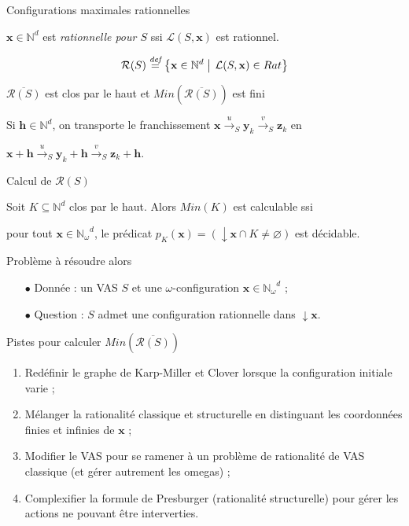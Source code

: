 \documentclass[french]{beamer}
\newcommand{\set}[2]{\left\{#1\mathrel{\left|\vphantom{#1}\vphantom{#2}\right.}#2\right\}}
\newcommand{\defeq}{\ensuremath{\stackrel{\textit{def}}{=}}}
\let\vide\varnothing
\newcommand{\Min}{\textit{Min}}
\newcommand{\N}{\ensuremath{\mathbb{N}}}
\newcommand{\Nomega}{\ensuremath{\mathbb{N}_\omega}}
\newcommand{\lang}{\ensuremath{\mathcal{L}}}
\newcommand{\trans}[2]{\ensuremath{\stackrel{#1}{\longrightarrow}_{#2}}}
\newcommand{\vect}[1]{\ensuremath{\mathbf{#1}}}
\newcommand{\inirat}{\mathcal{R}}
\let\oldemph\emph
\renewcommand{\emph}[1]{\oldemph{\color{blue}#1}}
\begin{document}
\begin{frame}{Configurations maximales rationnelles}
\begin{definition}
$\vect{x} \in \N^d$ est \emph{rationnelle pour $S$} ssi $\lang(S,\vect{x})$ est rationnel.

$$\inirat(S) \defeq \set{\vect{x} \in \N^d} {\lang(S,\vect{x}) \in Rat}$$
\end{definition}

\begin{theorem}
$\overline{\inirat(S)}$ est clos par le haut et 
$\Min(\overline{\inirat(S)})$ est fini
\end{theorem}

Si $\vect{h}\in\N^d$, on transporte le franchissement $\vect{x} \trans{u}{S} \vect{y}_k \trans{v}{S} \vect{z}_k$ en

$\vect{x} +\vect{h} \trans{u}{S} \vect{y}_k +\vect{h} \trans{v}{S} \vect{z}_k +\vect{h}$.
\end{frame}

\begin{frame}{Calcul de $\inirat(S)$}
\begin{theorem}
Soit $K \subseteq \N^d$ clos par le haut.
Alors $\Min(K)$ est calculable ssi

pour tout $\vect{x} \in \Nomega^d$, le prédicat $p_K(\vect{x}) = (\downarrow \vect{x} \cap K \neq \vide)$ est décidable.
\end{theorem}

\vspace{3mm}
Problème à résoudre alors
\begin{itemize}
	\item[$\bullet$] Donnée : un VAS $S$ et une $\omega$-configuration $\vect{x}\in\Nomega^d$ ;
	\item[$\bullet$] Question : $S$ admet une configuration rationnelle dans $\downarrow \vect{x}$.
\end{itemize}
\end{frame}

\begin{frame}{Pistes pour calculer $\Min(\overline{\inirat(S)})$}
\begin{enumerate}
    \item Redéfinir le graphe de Karp-Miller et Clover lorsque la configuration initiale varie ;
    \item Mélanger la rationalité classique et structurelle en distinguant les coordonnées finies et infinies de $\vect{x}$ ;
    \item Modifier le VAS pour se ramener à un problème de rationalité de VAS classique (et gérer autrement les omegas) ;
    \item Complexifier la formule de Presburger (rationalité structurelle) pour gérer les actions ne pouvant être interverties.
\end{enumerate}
\end{frame}
\end{document}
